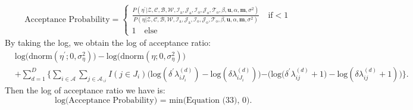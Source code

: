 \documentclass[a4paper]{article}
\begin{document}
 \begin{equation} 
 	\begin{split}
 		& \mbox{Acceptance Probability}=
 		\begin{cases}  \frac{P(\eta^\prime|\mathcal{Z},   \mathcal{C},  \mathcal{B}, \mathcal{W}, \mathcal{I}_{\mbox{a}}, \mathcal{J}_{\mbox{a}}, \mathcal{I}_{\mbox{o}}, \mathcal{J}_{\mbox{o}}, \mathcal{T}_{\mbox{o}}, \beta, \boldsymbol{u}, \alpha, \boldsymbol{m}, \sigma^2)}{P(\eta|\mathcal{Z},   \mathcal{C},   \mathcal{B}, \mathcal{W}, \mathcal{I}_{\mbox{a}}, \mathcal{J}_{\mbox{a}}, \mathcal{I}_{\mbox{o}}, \mathcal{J}_{\mbox{o}}, \mathcal{T}_{\mbox{o}}, \beta, \boldsymbol{u}, \alpha, \boldsymbol{m}, \sigma^2)}\quad\text{if}  <1\\
 			1 \quad \text{else}
 		\end{cases}
 	\end{split}
 \end{equation}
 By taking the log, we obtain the log of acceptance ratio:
 \begin{equation}
 	\begin{aligned} 
 		&\mbox{log}\Big(\mbox{dnorm}(\eta^\prime ;0, \sigma_\eta^2)\Big)-\mbox{log}\Big(\mbox{dnorm}(\eta; 0, \sigma_\eta^2)\Big)\\&+ \sum_{d=1}^D\Big\{\sum_{i\in \mathcal{A}}\sum_{j \in \mathcal{A}_{\backslash i }} {I(j \in J_i)}\Big(\mbox{log}(\delta^{\prime} \lambda^{(d)}_{iJ_i}) - \mbox{log}(\delta \lambda^{(d)}_{iJ_i})\Big)  {-\Big(\mbox{log}(\delta^{\prime} \lambda^{(d)}_{ij}}+1)
 		-\mbox{log}(\delta\lambda^{(d)}_{ij}+1)\Big) \Big\}.
 	\end{aligned}
 \end{equation}
  Then the log of acceptance ratio we have is:
 \begin{equation}
 	\mbox{log(Acceptance Probability) = min(Equation (33), 0). }
 \end{equation}
\end{document}
